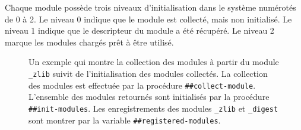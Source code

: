 
Chaque module possède trois niveaux d'initialisation dans le système numérotés de
0 à 2. Le niveau 0 indique que le module est collecté, mais non initialisé. Le
niveau 1 indique que le descripteur du module a été récupéré. Le niveau 2 marque
les modules chargés prêt à être utilisé. \\

\begin{figure}[h]
  \caption{Un exemple qui montre la collection des modules à partir du module
    \texttt{\_zlib} suivit de l'initialisation des modules collectés. La collection
    des modules est effectuée par la procédure \texttt{\#\#collect-module}. L'ensemble
    des modules retournés sont initialisés par la procédure \texttt{\#\#init-modules}.
    Les enregistrements des modules \texttt{\_zlib} et \texttt{\_digest} sont montrer
    par la variable \texttt{\#\#registered-modules}.}
\end{figure}

